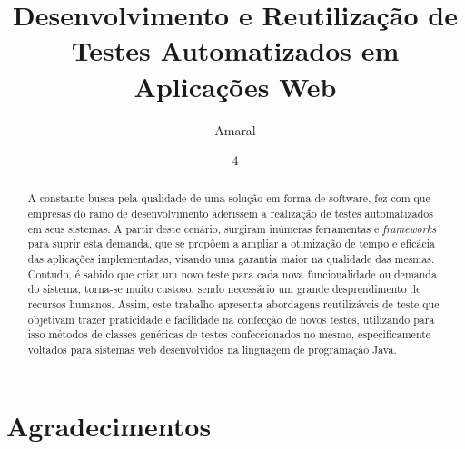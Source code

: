 \documentclass[tg]{mdtufsm}
\title{Desenvolvimento e Reutilização de Testes Automatizados em Aplicações Web}
\author{Amaral}{Lucas Antunes}
\institute{Centro de Tecnologia}
\date{4}{Dezembro}{2015}
\begin{document}
\maketitle
%

\chapter*{Agradecimentos}
\begin{abstract}
A constante busca pela qualidade de uma solução em forma de software, fez com que empresas do ramo de desenvolvimento aderissem a realização de testes automatizados em seus sistemas. A partir deste cenário,
surgiram inúmeras ferramentas e \emph{frameworks} para suprir esta demanda, que se propõem  a ampliar a otimização de tempo e eficácia das aplicações implementadas, visando uma garantia maior na qualidade das mesmas. Contudo, é sabido que criar um novo teste para cada nova funcionalidade ou demanda do sistema, torna-se muito custoso, sendo necessário um grande desprendimento de recursos humanos. Assim, este trabalho apresenta abordagens reutilizáveis de teste que objetivam trazer praticidade e facilidade na confecção de novos testes, utilizando para isso métodos de classes genéricas de testes confeccionados no mesmo, especificamente voltados para sistemas web desenvolvidos na linguagem de programação Java.
\end{abstract}


\tableofcontents
\listoffigures
\listoftables

\setlength{\baselineskip}{1.5\baselineskip}

\end{document}
